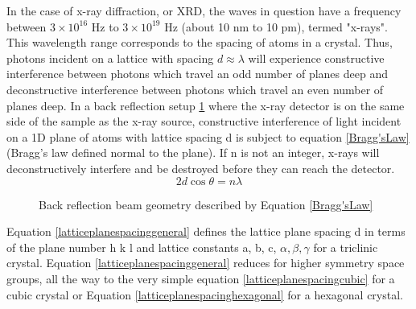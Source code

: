In the case of x-ray diffraction, or XRD, the waves in question have a frequency between $3\times10^{16}$ Hz to $3\times10^{19}$ Hz (about 10 nm to 10 pm), termed "x-rays". This wavelength range corresponds to the spacing of atoms in a crystal. Thus, photons incident on a lattice with spacing $d\approx\lambda$ will experience constructive interference between photons which travel an odd number of planes deep and deconstructive interference between photons which travel an even number of planes deep. In a back reflection setup \ref{BackRef} where the x-ray detector is on the same side of the sample as the x-ray source, constructive interference of light incident on a 1D plane of atoms with lattice spacing d is subject to equation \ref{Bragg'sLaw} (Bragg’s law defined normal to the plane). If n is not an integer, x-rays will deconstructively interfere and be destroyed before they can reach the detector.
\begin{equation}
    2d\cos{\theta} = n\lambda
    \label{Bragg'sLaw}
\end{equation}

\begin{figure}[htbp]
  \centering
  
  \caption{Back reflection beam geometry described by Equation \ref{Bragg'sLaw}}
  \label{BackRef}
\end{figure}

Equation \ref{latticeplanespacinggeneral} defines the lattice plane spacing d in terms of the plane number h k l and lattice constants a, b, c, $\alpha, \beta, \gamma$ for a triclinic crystal. Equation \ref{latticeplanespacinggeneral} reduces for higher symmetry space groups, all the way to the very simple equation \ref{latticeplanespacingcubic} for a cubic crystal or Equation \ref{latticeplanespacinghexagonal} for a hexagonal crystal.

